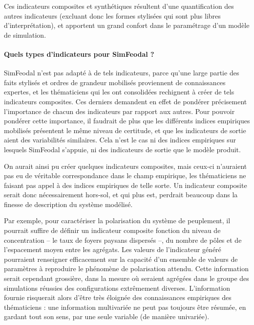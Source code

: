 Ces indicateurs composites et synthétiques résultent d'une quantification des autres indicateurs (excluant donc les formes stylisées qui sont plus libres d'interprétation), et apportent un grand confort dans le paramétrage d'un modèle de simulation.

\paragraph{Quels types d'indicateurs pour SimFeodal ?}\label{par:indicateurs-simfeodal}

SimFeodal n'est pas adapté à de tels indicateurs, parce qu'une large partie des faits stylisés et ordres de grandeur mobilisés proviennent de connaissances expertes, et les thématiciens qui les ont consolidées rechignent à créer de tels indicateurs composites.
Ces derniers demandent en effet de pondérer précisement l'importance de chacun des indicateurs par rapport aux autres.
Pour pouvoir pondérer cette importance, il faudrait de plus que les différents indices empiriques mobilisés présentent le même niveau de certitude, et que les indicateurs de sortie aient des variabilités similaires.
Cela n'est le cas ni des indices empiriques sur lesquels SimFeodal s'appuie, ni des indicateurs de sortie que le modèle produit.

On aurait ainsi pu créer quelques indicateurs composites, mais ceux-ci n'auraient pas eu de véritable correspondance dans le champ empirique, les thématiciens ne faisant pas appel à des indices empiriques de telle sorte.
Un indicateur composite serait donc nécessairement \og hors-sol\fg{}, et qui plus est, perdrait beaucoup dans la finesse de description du système modélisé.

Par exemple, pour caractériser la polarisation du système de peuplement, il pourrait suffire de définir un indicateur composite fonction du niveau de concentration -- le taux de foyers paysans dispersés --, du nombre de pôles et de l'espacement moyen entre les agrégats.
Les valeurs de l'indicateur généré pourraient renseigner efficacement sur la capacité d'un ensemble de valeurs de paramètres à reproduire le phénomène de polarisation attendu.
Cette information serait cependant grossière, dans la mesure où seraient agrégées dans le groupe des \og simulations réussies\fg{} des configurations extrêmement diverses.
L'information fournie risquerait alors d'être très éloignée des connaissances empiriques des thématiciens :
une information multivariée ne peut pas toujours être résumée, en gardant tout son sens, par une seule variable (de manière univariée).

